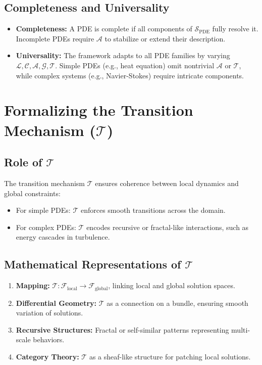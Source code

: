 \subsection{Completeness and Universality}
\begin{itemize}
    \item \textbf{Completeness:} A PDE is complete if all components of \(\mathcal{S}_{\text{PDE}}\) fully resolve it. Incomplete PDEs require \(\mathcal{A}\) to stabilize or extend their description.
    \item \textbf{Universality:} The framework adapts to all PDE families by varying \(\mathcal{L}, \mathcal{C}, \mathcal{A}, \mathcal{G}, \mathcal{T}\). Simple PDEs (e.g., heat equation) omit nontrivial \(\mathcal{A}\) or \(\mathcal{T}\), while complex systems (e.g., Navier-Stokes) require intricate components.
\end{itemize}

\section{Formalizing the Transition Mechanism (\(\mathcal{T}\))}
\subsection{Role of \(\mathcal{T}\)}
The transition mechanism \(\mathcal{T}\) ensures coherence between local dynamics and global constraints:
\begin{itemize}
    \item For simple PDEs: \(\mathcal{T}\) enforces smooth transitions across the domain.
    \item For complex PDEs: \(\mathcal{T}\) encodes recursive or fractal-like interactions, such as energy cascades in turbulence.
\end{itemize}

\subsection{Mathematical Representations of \(\mathcal{T}\)}
\begin{enumerate}
    \item \textbf{Mapping:} \(\mathcal{T}: \mathcal{F}_{\text{local}} \to \mathcal{F}_{\text{global}}\), linking local and global solution spaces.
    \item \textbf{Differential Geometry:} \(\mathcal{T}\) as a connection on a bundle, ensuring smooth variation of solutions.
    \item \textbf{Recursive Structures:} Fractal or self-similar patterns representing multi-scale behaviors.
    \item \textbf{Category Theory:} \(\mathcal{T}\) as a sheaf-like structure for patching local solutions.
\end{enumerate}

